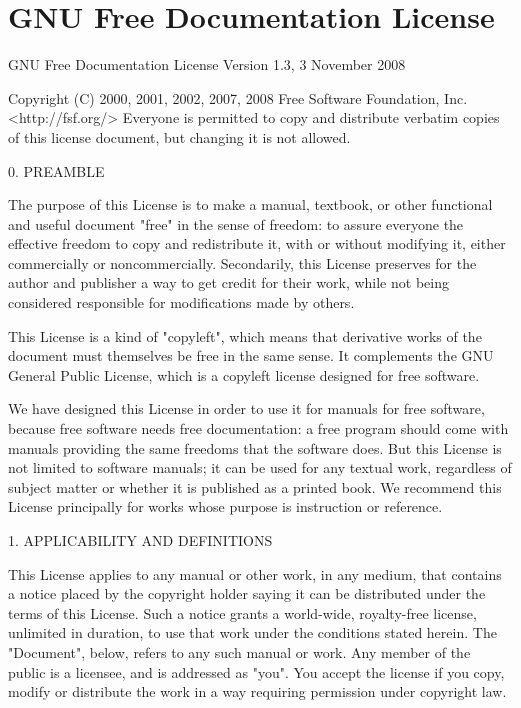 \documentclass[11pt,a4paper]{article}
\begin{document}
\section{GNU Free Documentation License}
\begin{scriptsize}

                GNU Free Documentation License
                 Version 1.3, 3 November 2008


 Copyright (C) 2000, 2001, 2002, 2007, 2008 Free Software Foundation, Inc.
     <http://fsf.org/>
 Everyone is permitted to copy and distribute verbatim copies
 of this license document, but changing it is not allowed.

0. PREAMBLE

The purpose of this License is to make a manual, textbook, or other
functional and useful document "free" in the sense of freedom: to
assure everyone the effective freedom to copy and redistribute it,
with or without modifying it, either commercially or noncommercially.
Secondarily, this License preserves for the author and publisher a way
to get credit for their work, while not being considered responsible
for modifications made by others.

This License is a kind of "copyleft", which means that derivative
works of the document must themselves be free in the same sense.  It
complements the GNU General Public License, which is a copyleft
license designed for free software.

We have designed this License in order to use it for manuals for free
software, because free software needs free documentation: a free
program should come with manuals providing the same freedoms that the
software does.  But this License is not limited to software manuals;
it can be used for any textual work, regardless of subject matter or
whether it is published as a printed book.  We recommend this License
principally for works whose purpose is instruction or reference.


1. APPLICABILITY AND DEFINITIONS

This License applies to any manual or other work, in any medium, that
contains a notice placed by the copyright holder saying it can be
distributed under the terms of this License.  Such a notice grants a
world-wide, royalty-free license, unlimited in duration, to use that
work under the conditions stated herein.  The "Document", below,
refers to any such manual or work.  Any member of the public is a
licensee, and is addressed as "you".  You accept the license if you
copy, modify or distribute the work in a way requiring permission
under copyright law.


\end{scriptsize}
\end{document}
